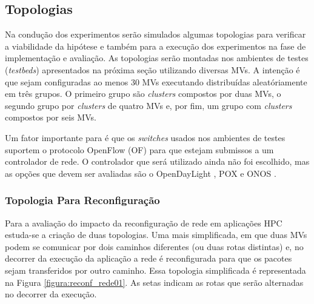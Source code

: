 \documentclass[10pt, conference, compsocconf]{IEEEtran}
\begin{document}
\begin{table}[h!]
\caption{Métricas para estudo de viabilidade.}
\label{tabela:metricas_viabilidade}
\end{table}

\subsection{Topologias}
Na condução dos experimentos serão simulados algumas topologias para verificar a viabilidade da hipótese e também para a execução dos experimentos na fase de implementação e avaliação. As topologias serão montadas nos ambientes de testes (\textit{testbeds}) apresentados na próxima seção utilizando diversas MVs. A intenção é que sejam configuradas ao menos 30 MVs executando distribuídas aleatóriamente em três grupos. O primeiro grupo são \textit{clusters} compostos por duas MVs, o segundo grupo por \textit{clusters} de quatro MVs e, por fim, um grupo com \textit{clusters} compostos por seis MVs.

Um fator importante para é que os \textit{switches} usados nos ambientes de testes suportem o protocolo OpenFlow (OF) para que estejam submissos a um controlador de rede. O controlador que será utilizado ainda não foi escolhido, mas as opções que devem ser avaliadas são o OpenDayLight \cite{Medvel:2013}, POX \cite{Rodrigues2014} e ONOS \cite{Berde:2014}.

\subsubsection{Topologia Para Reconfiguração}
Para a avaliação do impacto da reconfiguração de rede em aplicações HPC estuda-se a criação de duas topologias. Uma mais simplificada, em que duas MVs podem se comunicar por dois caminhos diferentes (ou duas rotas distintas) e, no decorrer da execução da aplicação a rede é reconfigurada para que os pacotes sejam transferidos por outro caminho. Essa topologia simplificada é representada na Figura \ref{figura:reconf_rede01}. As setas indicam as rotas que serão alternadas no decorrer da execução. 
\end{document}
